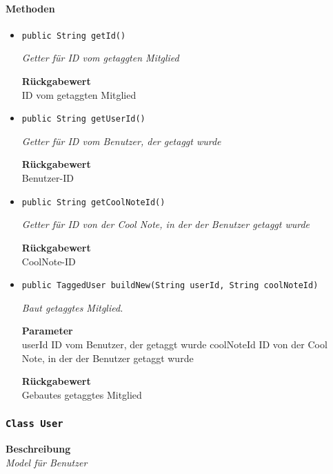     \paragraph*{Methoden}
    \begin{itemize}
    	\item{\texttt{public String getId()}}
    	
    	\textit{Getter für ID vom getaggten Mitglied}
    	
    	
    	
    	\textbf{Rückgabewert} \\
    	ID vom getaggten Mitglied        \item{\texttt{public String getUserId()}}
    	
    	\textit{Getter für ID vom Benutzer, der getaggt wurde}
    	
    	
    	
    	\textbf{Rückgabewert} \\
    	Benutzer-ID        \item{\texttt{public String getCoolNoteId()}}
    	
    	\textit{Getter für ID von der Cool Note, in der der Benutzer getaggt wurde}
    	
    	
    	
    	\textbf{Rückgabewert} \\
    	CoolNote-ID        \item{\texttt{public TaggedUser buildNew(String userId, String coolNoteId)}}
    	
    	\textit{Baut getaggtes Mitglied.}
    	
    	\textbf{Parameter} \\
    	userId ID vom Benutzer, der getaggt wurde
    	coolNoteId ID von der Cool Note, in der der Benutzer getaggt wurde
    	
    	\textbf{Rückgabewert} \\
    	Gebautes getaggtes Mitglied
    \end{itemize}
    \subsubsection{\texttt{Class User}}
    \textbf{Beschreibung} \\
    \textit{Model für Benutzer}
